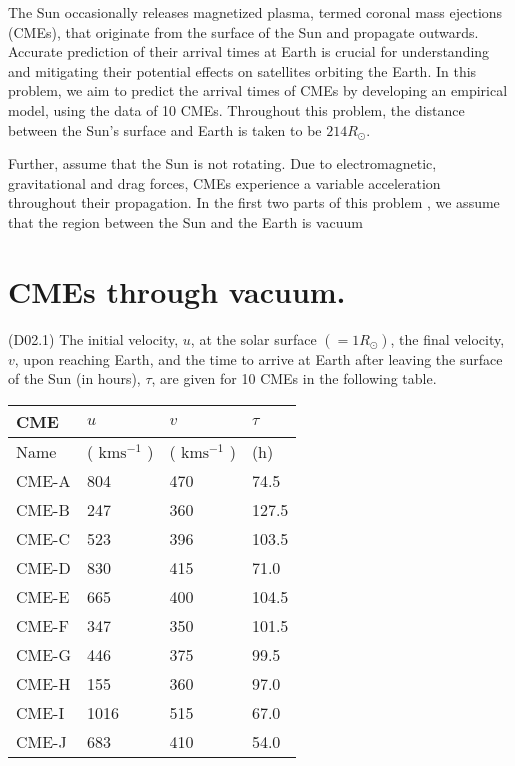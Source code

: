 \documentclass[10pt]{article}
\begin{document}
    The Sun occasionally releases magnetized plasma, termed coronal mass ejections (CMEs), that originate from the surface of the Sun and propagate outwards. Accurate prediction of their arrival times at Earth is crucial for understanding and mitigating their potential effects on satellites orbiting the Earth. In this problem, we aim to predict the arrival times of CMEs by developing an empirical model, using the data of 10 CMEs. Throughout this problem, the distance between the Sun's surface and Earth is taken to be $214 R_{\odot}$.

    Further, assume that the Sun is not rotating. Due to electromagnetic, gravitational and drag forces, CMEs experience a variable acceleration throughout their propagation. In the first two parts of this problem , we assume that the region between the Sun and the Earth is vacuum
    
    \section*{CMEs through vacuum.}
    (D02.1) The initial velocity, $u$, at the solar surface $\left(=1 R_{\odot}\right)$, the final velocity, $v$, upon reaching Earth, and the time to arrive at Earth after leaving the surface of the Sun (in hours), $\tau$, are given for 10 CMEs in the following table.
    
    \begin{center}
    \begin{tabular}{|l|l|l|l|}
    \hline
    CME & $u$ & $v$ & $\tau$ \\
    \hline
    Name & ( $\mathrm{km} \mathrm{s}^{-1}$ ) & ( $\mathrm{km} \mathrm{s}^{-1}$ ) & (h) \\
    \hline
    CME-A & 804 & 470 & 74.5 \\
    \hline
    CME-B & 247 & 360 & 127.5 \\
    \hline
    CME-C & 523 & 396 & 103.5 \\
    \hline
    CME-D & 830 & 415 & 71.0 \\
    \hline
    CME-E & 665 & 400 & 104.5 \\
    \hline
    CME-F & 347 & 350 & 101.5 \\
    \hline
    CME-G & 446 & 375 & 99.5 \\
    \hline
    CME-H & 155 & 360 & 97.0 \\
    \hline
    CME-I & 1016 & 515 & 67.0 \\
    \hline
    CME-J & 683 & 410 & 54.0 \\
    \hline
    \end{tabular}
    \end{center}
    
\end{document}
